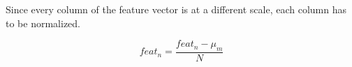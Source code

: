 Since every column of the feature vector is at a different
scale, each column has to be normalized.

\begin{equation}
feat_n = \frac{feat_n - \mu_m}{N}
\label{eq:}
\end{equation} 
